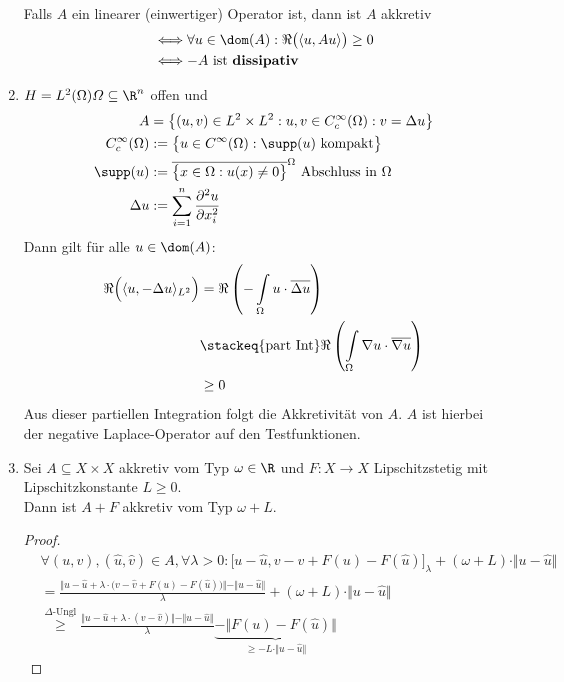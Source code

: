 \begin{beispiel}
\begin{enumerate}[label=(\alph*)]
Falls $A$ ein linearer (einwertiger) Operator ist, dann ist $A$ akkretiv
\begin{align*}
&\Longleftrightarrow\forall u\in\dom(A):\Re\big(\langle u, Au\rangle\big)\geq0\\
&\Longleftrightarrow -A\text{ ist \textbf{dissipativ}}
\end{align*}
\item $H=L^2(\Omega)\mit\Omega\subseteq\R^n$ offen und 
\begin{align*}
A&=\big\lbrace(u,v)\in L^2\times L^2:u,v\in C_c^\infty(\Omega):v=\Delta u\big\rbrace\\
C_c^\infty(\Omega)&:=\big\lbrace u\in C^\infty(\Omega):\supp(u)\text{ kompakt}\big\rbrace\\
\supp(u)&:=\overline{\big\lbrace x\in\Omega:u(x)\neq0\big\rbrace}^\Omega\text{ Abschluss in }\Omega\\
\Delta u&:=\sum\limits_{i=1}^n\frac{\partial^2 u}{\partial x_i^2}
\end{align*}
Dann gilt für alle $u\in\dom(A)$:
\begin{align*}
\Re\Big(\langle u,-\Delta u\rangle_{L^2}\Big) 
&= \Re\left(-\int\limits_\Omega u\cdot\overline{\Delta u}\right)\\
&\stackeq{\text{part Int}}
\Re\left(\int\limits_{\Omega} \nabla u\cdot\overline{\nabla u}\right)\\
&\geq0
\end{align*}
Aus dieser partiellen Integration folgt die Akkretivität von $A$. $A$ ist hierbei der negative Laplace-Operator auf den Testfunktionen.
\item Sei $A\subseteq X\times X$ akkretiv vom Typ $\omega\in\R$ und $F:X\to X$ Lipschitzstetig mit Lipschitzkonstante $L\geq0$.\\
Dann ist $A+F$ akkretiv vom Typ $\omega+L$.
\begin{proof}
\begin{align*}
&\forall (u,v),(\hat{u},\hat{v})\in A,\forall\lambda>0:
\big[u-\hat{u},v-\hat{v}+F(u)-F(\hat{u})\big]_\lambda
+(\omega+L)\cdot\Vert u-\hat{u}\Vert\\
&=\frac{\Big\Vert u-\hat{u}+\lambda\cdot\big(v-\hat{v}+F(u)-F(\hat{u})\big)\Big\Vert-\Vert u-\hat{u}\Vert}{\lambda}
+(\omega+L)\cdot\Vert u-\hat{u}\Vert\\
&\stackrel{\Delta\text{-Ungl}}{\geq}
\frac{\big\Vert u-\hat{u}+\lambda\cdot(v-\hat{v})\big\Vert-\Vert u-\hat{u}\Vert}{\lambda}\underbrace{-\big\Vert F(u)-F(\hat{u})\big\Vert}_{\geq -L\cdot\Vert u-\hat{u}\Vert}

\end{align*}
\end{proof}
\end{enumerate}
\end{beispiel}
